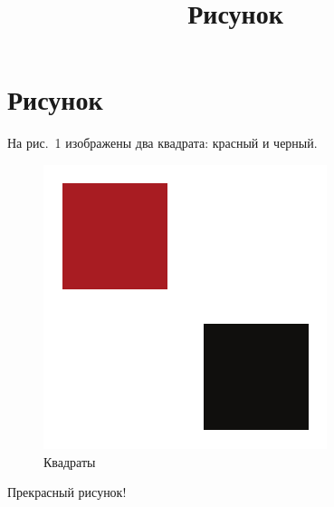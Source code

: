 \documentclass[a4paper,12pt]{article}
\title{Рисунок}
\begin{document}
\section*{Рисунок}

На рис.~1 изображены два квадрата: красный и черный.

\begin{figure}[bhtp]
\centering
\includegraphics{figure}
\caption{Квадраты}\label{squares}
\end{figure}

Прекрасный рисунок!
\end{document}
